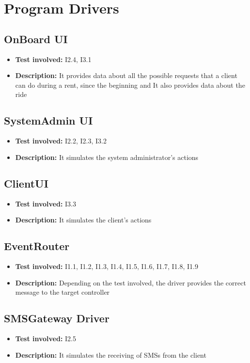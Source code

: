 \section{Program Drivers}

\subsection{OnBoard UI}
\begin{itemize}
\item \textbf{Test involved:} I2.4, I3.1
\item \textbf{Description:} It provides data about all the possible requests that a client can do during a rent, since the beginning and It also provides data about the ride
\end{itemize}

\subsection{SystemAdmin UI}
\begin{itemize}
\item \textbf{Test involved:} I2.2, I2.3, I3.2
\item \textbf{Description:} It simulates the system administrator’s actions
\end{itemize}

\subsection{ClientUI}
\begin{itemize}
\item \textbf{Test involved:} I3.3
\item \textbf{Description:} It simulates the client’s actions
\end{itemize}

\subsection{EventRouter}
\begin{itemize}
\item \textbf{Test involved:} I1.1, I1.2, I1.3, I1.4, I1.5, I1.6, I1.7, I1.8, I1.9
\item \textbf{Description:} Depending on the test involved, the driver provides the correct message to the target controller
\end{itemize}

\subsection{SMSGateway Driver}
\begin{itemize}
\item \textbf{Test involved:} I2.5
\item \textbf{Description:} It simulates the receiving of SMSs from the client
\end{itemize}

